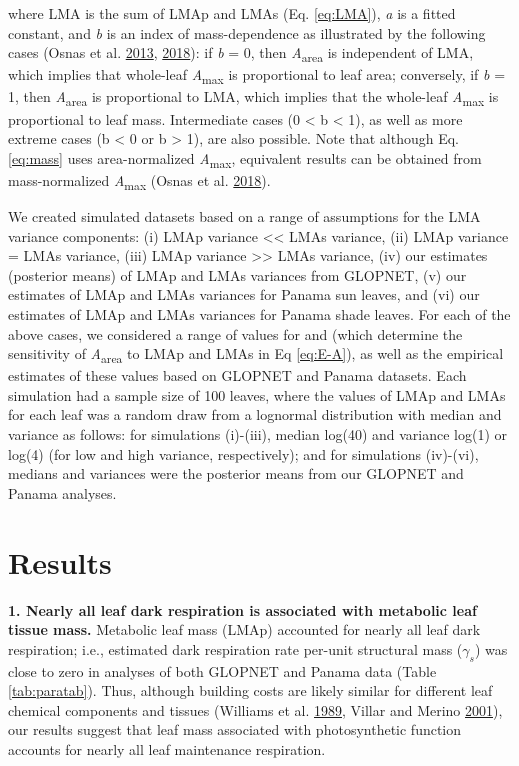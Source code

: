 \documentclass[
  12pt,
]{article}
\begin{document}
where LMA is the sum of LMAp and LMAs (Eq. \eqref{eq:LMA}), \emph{a} is a fitted constant, and \emph{b} is an index of mass-dependence as illustrated by the following cases (Osnas et al. \protect\hyperlink{ref-Osnas2013}{2013}, \protect\hyperlink{ref-Osnas2018}{2018}): if \emph{b} = 0, then \emph{A}\textsubscript{area} is independent of LMA, which implies that whole-leaf \emph{A}\textsubscript{max} is proportional to leaf area; conversely, if \emph{b} = 1, then \emph{A}\textsubscript{area} is proportional to LMA, which implies that the whole-leaf \emph{A}\textsubscript{max} is proportional to leaf mass.
Intermediate cases (0 \textless{} b \textless{} 1), as well as more extreme cases (b \textless{} 0 or b \textgreater{} 1), are also possible.
Note that although Eq. \eqref{eq:mass} uses area-normalized \emph{A}\textsubscript{max}, equivalent results can be obtained from mass-normalized \emph{A}\textsubscript{max} (Osnas et al. \protect\hyperlink{ref-Osnas2018}{2018}).

We created simulated datasets based on a range of assumptions for the LMA variance components: (i) LMAp variance \textless\textless{} LMAs variance, (ii) LMAp variance = LMAs variance, (iii) LMAp variance \textgreater\textgreater{} LMAs variance, (iv) our estimates (posterior means) of LMAp and LMAs variances from GLOPNET, (v) our estimates of LMAp and LMAs variances for Panama sun leaves, and (vi) our estimates of LMAp and LMAs variances for Panama shade leaves.
For each of the above cases, we considered a range of values for and (which determine the sensitivity of \emph{A}\textsubscript{area} to LMAp and LMAs in Eq \eqref{eq:E-A}), as well as the empirical estimates of these values based on GLOPNET and Panama datasets.
Each simulation had a sample size of 100 leaves, where the values of LMAp and LMAs for each leaf was a random draw from a lognormal distribution with median and variance as follows: for simulations (i)-(iii), median log(40) and variance log(1) or log(4) (for low and high variance, respectively); and for simulations (iv)-(vi), medians and variances were the posterior means from our GLOPNET and Panama analyses.

\hypertarget{results}{%
\section{Results}\label{results}}

\textbf{1. Nearly all leaf dark respiration is associated with metabolic leaf tissue mass.}
Metabolic leaf mass (LMAp) accounted for nearly all leaf dark respiration; i.e., estimated dark respiration rate per-unit structural mass (\(\gamma_s\)) was close to zero in analyses of both GLOPNET and Panama data (Table \ref{tab:paratab}).
Thus, although building costs are likely similar for different leaf chemical components and tissues (Williams et al. \protect\hyperlink{ref-Williams1989}{1989}, Villar and Merino \protect\hyperlink{ref-Villar2001}{2001}), our results suggest that leaf mass associated with photosynthetic function accounts for nearly all leaf maintenance respiration.
\end{document}
